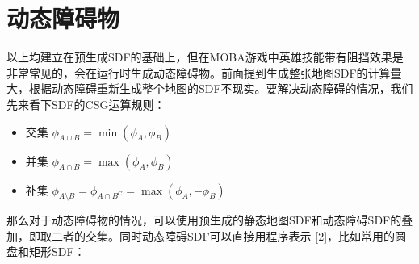 \begin{Shaded}
\begin{Highlighting}[]
    \NormalTok{ (}\NormalTok{) \{}
\NormalTok{    \}}
\NormalTok{\}}
\end{Highlighting}
\end{Shaded}

\hypertarget{ux52a8ux6001ux969cux788dux7269}{%
\section{动态障碍物}\label{ux52a8ux6001ux969cux788dux7269}}

以上均建立在预生成SDF的基础上，但在MOBA游戏中英雄技能带有阻挡效果是非常常见的，会在运行时生成动态障碍物。前面提到生成整张地图SDF的计算量大，根据动态障碍重新生成整个地图的SDF不现实。要解决动态障碍的情况，我们先来看下SDF的CSG运算规则：

\begin{itemize}
\tightlist
\item
  交集 \(\phi_{A\cup B}=\min(\phi_A,\phi_B)\)
\item
  并集 \(\phi_{A\cap B}=\max(\phi_A,\phi_B)\)
\item
  补集 \(\phi_{A\setminus B}=\phi_{A \cap B^C}=\max(\phi_A,-\phi_B)\)
\end{itemize}

那么对于动态障碍物的情况，可以使用预生成的静态地图SDF和动态障碍SDF的叠加，即取二者的交集。同时动态障碍SDF可以直接用程序表示
{[}2{]}，比如常用的圆盘和矩形SDF：

